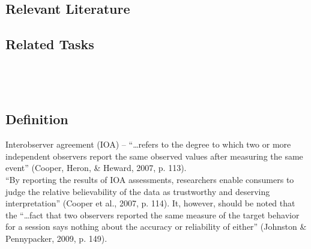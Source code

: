 \subsection{Relevant Literature}
\begin{refsection}
\nocite{test,alang2017police,clayton2018black}
\printbibliography[heading=none]
\end{refsection}
%
\subsection{Related Tasks}
\fourhOne{}\\
\fourhThree{}\\
%
%
%
%
%
\section{\fouraEight{}}
\subsection{Definition} 
Interobserver agreement (IOA) –  ``…refers to the degree to which two or more independent observers report the same observed values after measuring the same event'' (Cooper, Heron, \& Heward, 2007, p. 113).\\

``By reporting the results of IOA assessments, researchers enable consumers to judge the relative believability of the data as trustworthy and deserving interpretation'' (Cooper et al., 2007, p. 114). It, however, should be noted that the ``…fact that two observers reported the same measure of the target behavior for a session says nothing about the accuracy or reliability of either'' (Johnston \& Pennypacker, 2009, p. 149).

